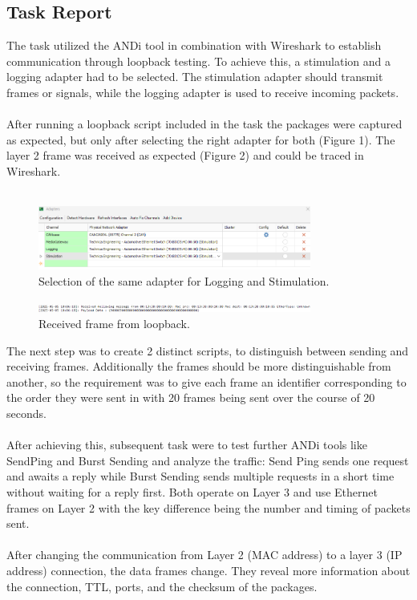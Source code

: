 \subsection{Task Report}
The task utilized the ANDi tool in combination with Wireshark to establish communication through loopback testing. To achieve this, a stimulation and a logging adapter had to be selected. The stimulation adapter should transmit frames or signals, while the logging adapter is used to receive incoming packets.\\\\
After running a loopback script included in the task the packages were captured as expected, but only after selecting the right adapter for both (Figure 1). The layer 2 frame was received as expected (Figure 2) and could be traced in Wireshark.\\\\
\begin{figure}[h]
    \centering
     \includegraphics[width=0.8\textwidth]{figures/pictures/adaptersloopback.png}
    \caption{Selection of the same adapter for Logging and Stimulation.}
    \label{fig:mediagateway_setup}
\end{figure}
\begin{figure}[h]
    \centering
     \includegraphics[width=0.8\textwidth]{figures/pictures/loopbackreceived.png}
    \caption{Received frame from loopback.}
    \label{fig:mediagateway_setup}
\end{figure}
The next step was to create 2 distinct scripts, to distinguish between sending and receiving frames. Additionally the frames should be more distinguishable from another, so the requirement was to give each frame an identifier corresponding to the order they were sent in with 20 frames being sent over the course of 20 seconds.\\\\
After achieving this, subsequent task were to test further ANDi tools like SendPing and Burst Sending and analyze the traffic: Send Ping sends one request and awaits a reply while Burst Sending sends multiple requests in a short time without waiting for a reply first. Both operate on Layer 3 and use Ethernet frames on Layer 2 with the key difference being the number and timing of packets sent. \\\\
After changing the communication from Layer 2 (MAC address) to a layer 3 (IP address)  connection, the data frames change. They reveal more information about the connection, TTL, ports, and the checksum of the packages. 

